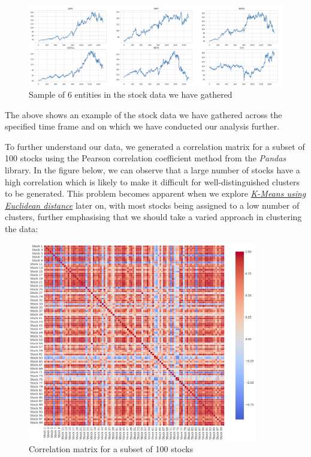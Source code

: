 \documentclass[11pt]{article}
\begin{document}
\begin{figure}[H]
\centering
\includegraphics[width=12cm]{img/stocks.png} 
\caption{Sample of 6 entities in the stock data we have gathered}

\end{figure}

The above shows an example of the stock data we have gathered across the specified time frame and on which we have conducted our analysis further. 

To further understand our data, we generated a correlation matrix for a subset of 100 stocks using the Pearson correlation coefficient method from the \textit{Pandas} library. In the figure below, we can observe that a large number of stocks have a high correlation which is likely to make it difficult for well-distinguished clusters to be generated. This problem becomes apparent when we explore \textit{\hyperref[sec:stockskmeanseuclidean]{K-Means using Euclidean distance}} later on, with most stocks being assigned to a low number of clusters, further emphasising that we should take a varied approach in clustering the data:
 
\begin{figure}[H]
\centering
\includegraphics[width=10cm]{img/correlation.png} 
\caption{Correlation matrix for a subset of 100 stocks}
\end{figure}
\end{document}
